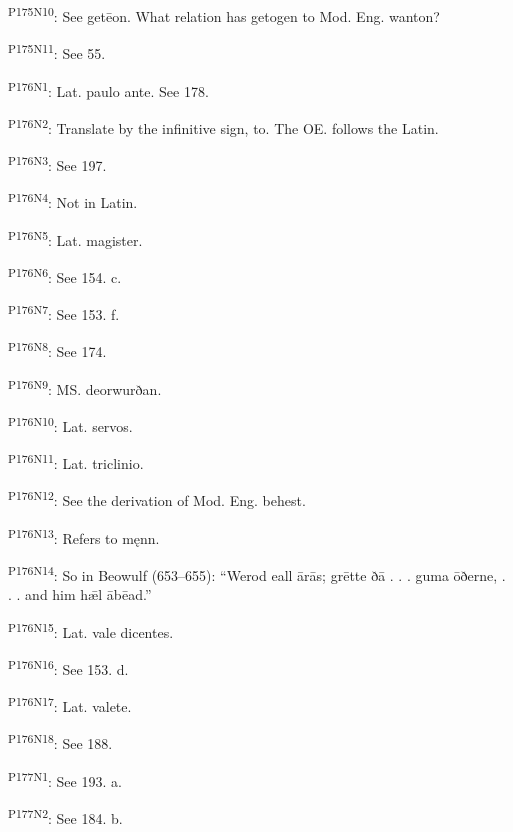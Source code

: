 \textsuperscript{P175N10}: See getēon. What relation has getogen to Mod. Eng. wanton?

\textsuperscript{P175N11}: See 55.

\textsuperscript{P176N1}: Lat. paulo ante. See 178.

\textsuperscript{P176N2}: Translate by the infinitive sign, to. The OE. follows the Latin.

\textsuperscript{P176N3}: See 197.

\textsuperscript{P176N4}: Not in Latin.

\textsuperscript{P176N5}: Lat. magister.

\textsuperscript{P176N6}: See 154. c.

\textsuperscript{P176N7}: See 153. f.

\textsuperscript{P176N8}: See 174.

\textsuperscript{P176N9}: MS. deorwurðan.

\textsuperscript{P176N10}: Lat. servos.

\textsuperscript{P176N11}: Lat. triclinio.

\textsuperscript{P176N12}: See the derivation of Mod. Eng. behest.

\textsuperscript{P176N13}: Refers to męnn.

\textsuperscript{P176N14}: So in Beowulf (653–655): “Werod eall ārās; grētte ðā . . . guma ōðerne, . . . and him hǣl ābēad.”

\textsuperscript{P176N15}: Lat. vale dicentes.

\textsuperscript{P176N16}: See 153. d.

\textsuperscript{P176N17}: Lat. valete.

\textsuperscript{P176N18}: See 188.

\textsuperscript{P177N1}: See 193. a.

\textsuperscript{P177N2}: See 184. b.

\endgroup

\par\label{end-ch18-learner}
\clearpage\endgroup
